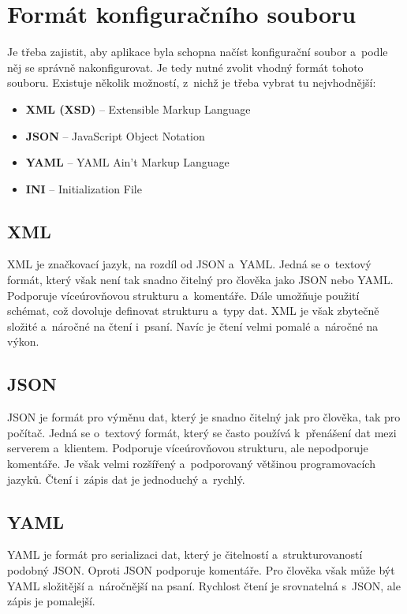 \section{Formát konfiguračního souboru}
Je třeba zajistit, aby aplikace byla schopna načíst konfigurační soubor a~podle něj se správně nakonfigurovat.
Je tedy nutné zvolit vhodný formát tohoto souboru.
Existuje několik možností, z~nichž je třeba vybrat tu nejvhodnější:

\begin{itemize}
    \item \textbf{XML (XSD)} -- Extensible Markup Language
    \item \textbf{JSON} -- JavaScript Object Notation
    \item \textbf{YAML} -- YAML Ain't Markup Language
    \item \textbf{INI} -- Initialization File
\end{itemize}

\subsection{XML}
XML je značkovací jazyk, na rozdíl od JSON a~YAML.
Jedná se o~textový formát, který však není tak snadno čitelný pro člověka jako JSON nebo YAML.
Podporuje víceúrovňovou strukturu a~komentáře.
Dále umožňuje použití schémat, což dovoluje definovat strukturu a~typy dat.
XML je však zbytečně složité a~náročné na čtení i~psaní.
Navíc je čtení velmi pomalé a~náročné na výkon.
\cite{cisco_xml_json_yaml}

\subsection{JSON}
JSON je formát pro výměnu dat, který je snadno čitelný jak pro člověka, tak pro počítač.
Jedná se o~textový formát, který se často používá k~přenášení dat mezi serverem a~klientem.
Podporuje víceúrovňovou strukturu, ale nepodporuje komentáře.
Je však velmi rozšířený a~podporovaný většinou programovacích jazyků.
Čtení i~zápis dat je jednoduchý a~rychlý.
\cite{cisco_xml_json_yaml}

\subsection{YAML}
YAML je formát pro serializaci dat, který je čitelností a~strukturovaností podobný JSON.
Oproti JSON podporuje komentáře.
Pro člověka však může být YAML složitější a~náročnější na psaní.
Rychlost čtení je srovnatelná s~JSON, ale zápis je pomalejší.
\cite{cisco_xml_json_yaml}

